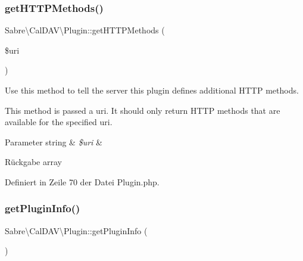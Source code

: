 \mbox{\label{class_sabre_1_1_cal_d_a_v_1_1_plugin_a43365a562ed35d39fc4d8d4f1d3940f2}} 
\subsubsection{\texorpdfstring{get\+H\+T\+T\+P\+Methods()}{getHTTPMethods()}}
{\footnotesize\ttfamily Sabre\textbackslash{}\+Cal\+D\+A\+V\textbackslash{}\+Plugin\+::get\+H\+T\+T\+P\+Methods (\begin{DoxyParamCaption}\item[{}]{\$uri }\end{DoxyParamCaption})}

Use this method to tell the server this plugin defines additional H\+T\+TP methods.

This method is passed a uri. It should only return H\+T\+TP methods that are available for the specified uri.


\begin{DoxyParams}[1]{Parameter}
string & {\em \$uri} & \\
\hline
\end{DoxyParams}
\begin{DoxyReturn}{Rückgabe}
array 
\end{DoxyReturn}


Definiert in Zeile 70 der Datei Plugin.\+php.

\mbox{\label{class_sabre_1_1_cal_d_a_v_1_1_plugin_a846412fa6fff563d2a964d881b82d250}} 
\subsubsection{\texorpdfstring{get\+Plugin\+Info()}{getPluginInfo()}}
{\footnotesize\ttfamily Sabre\textbackslash{}\+Cal\+D\+A\+V\textbackslash{}\+Plugin\+::get\+Plugin\+Info (\begin{DoxyParamCaption}{ }\end{DoxyParamCaption})}

